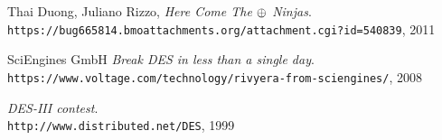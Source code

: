 \begin{thebibliography}{9}
Thai Duong, Juliano Rizzo, 
\textit{Here Come The $\mathbin{\oplus}$ Ninjas}. \\
\texttt{https://bug665814.bmoattachments.org/attachment.cgi?id=540839}, 2011

SciEngines GmbH
\textit{Break DES in less than a single day}. \\
\texttt{https://www.voltage.com/technology/rivyera-from-sciengines/}, 2008

\textit{DES-III contest}. \\
\texttt{http://www.distributed.net/DES}, 1999

\end{thebibliography}